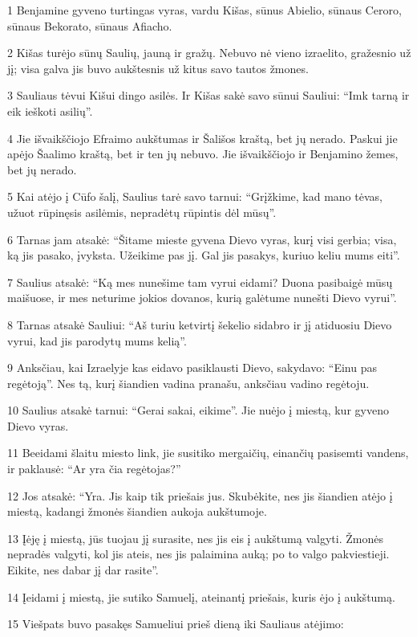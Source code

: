 \par 1 Benjamine gyveno turtingas vyras, vardu Kišas, sūnus Abielio, sūnaus Ceroro, sūnaus Bekorato, sūnaus Afiacho. 
\par 2 Kišas turėjo sūnų Saulių, jauną ir gražų. Nebuvo nė vieno izraelito, gražesnio už jį; visa galva jis buvo aukštesnis už kitus savo tautos žmones. 
\par 3 Sauliaus tėvui Kišui dingo asilės. Ir Kišas sakė savo sūnui Sauliui: “Imk tarną ir eik ieškoti asilių”. 
\par 4 Jie išvaikščiojo Efraimo aukštumas ir Šališos kraštą, bet jų nerado. Paskui jie apėjo Šaalimo kraštą, bet ir ten jų nebuvo. Jie išvaikščiojo ir Benjamino žemes, bet jų nerado. 
\par 5 Kai atėjo į Cūfo šalį, Saulius tarė savo tarnui: “Grįžkime, kad mano tėvas, užuot rūpinęsis asilėmis, nepradėtų rūpintis dėl mūsų”. 
\par 6 Tarnas jam atsakė: “Šitame mieste gyvena Dievo vyras, kurį visi gerbia; visa, ką jis pasako, įvyksta. Užeikime pas jį. Gal jis pasakys, kuriuo keliu mums eiti”. 
\par 7 Saulius atsakė: “Ką mes nunešime tam vyrui eidami? Duona pasibaigė mūsų maišuose, ir mes neturime jokios dovanos, kurią galėtume nunešti Dievo vyrui”. 
\par 8 Tarnas atsakė Sauliui: “Aš turiu ketvirtį šekelio sidabro ir jį atiduosiu Dievo vyrui, kad jis parodytų mums kelią”. 
\par 9 Anksčiau, kai Izraelyje kas eidavo pasiklausti Dievo, sakydavo: “Einu pas regėtoją”. Nes tą, kurį šiandien vadina pranašu, anksčiau vadino regėtoju. 
\par 10 Saulius atsakė tarnui: “Gerai sakai, eikime”. Jie nuėjo į miestą, kur gyveno Dievo vyras. 
\par 11 Beeidami šlaitu miesto link, jie susitiko mergaičių, einančių pasisemti vandens, ir paklausė: “Ar yra čia regėtojas?” 
\par 12 Jos atsakė: “Yra. Jis kaip tik priešais jus. Skubėkite, nes jis šiandien atėjo į miestą, kadangi žmonės šiandien aukoja aukštumoje. 
\par 13 Įėję į miestą, jūs tuojau jį surasite, nes jis eis į aukštumą valgyti. Žmonės nepradės valgyti, kol jis ateis, nes jis palaimina auką; po to valgo pakviestieji. Eikite, nes dabar jį dar rasite”. 
\par 14 Įeidami į miestą, jie sutiko Samuelį, ateinantį priešais, kuris ėjo į aukštumą. 
\par 15 Viešpats buvo pasakęs Samueliui prieš dieną iki Sauliaus atėjimo: 
